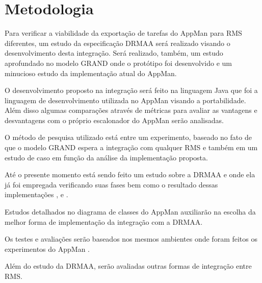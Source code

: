 \section{Metodologia}
\label{cap:metodologia}

Para verificar a viabilidade da exportação de tarefas do AppMan para RMS diferentes, um estudo da especificação DRMAA será realizado visando o desenvolvimento desta integração. Será realizado, também, um estudo aprofundado no modelo GRAND onde o protótipo foi desenvolvido e um minucioso estudo da implementação atual do AppMan.

O desenvolvimento proposto na integração será feito na linguagem Java que foi a linguagem de desenvolvimento utilizada no AppMan visando a portabilidade. Além disso algumas comparações através de métricas para avaliar as vantagens e desvantagens com o próprio escalonador do AppMan serão analisadas.

O método de pesquisa utilizado está entre um experimento, baseado no fato de que o modelo GRAND espera a integração com qualquer RMS e também em um estudo de caso em função da análise da implementação proposta.

Até o presente momento está sendo feito um estudo sobre a DRMAA e onde ela já foi empregada verificando suas fases bem como o resultado dessas implementações \cite{Templeton}, \cite{Llorente2005} e \cite{Haas2004}.

Estudos detalhados no diagrama de classes do AppMan auxiliarão na escolha da melhor forma de implementação da integração com a DRMAA.

Os testes e avaliações serão baseados nos mesmos ambientes onde foram feitos os experimentos do AppMan \cite{Mangan2006}. 

Além do estudo da DRMAA, serão avaliadas outras formas de integração entre RMS.
